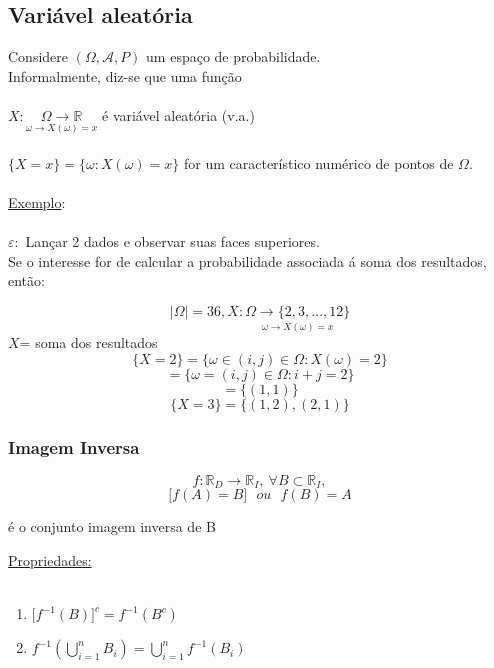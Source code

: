 \documentclass[a4paper,12pt]{article}
\begin{document}
\subsection{Variável aleatória}
Considere $(\Omega,\mathscr{A},P)$ um espaço de probabilidade.\\
Informalmente, diz-se que uma função\\
\\
$X: \underset{\omega \longrightarrow X(\omega)=x}{\Omega \longrightarrow \mathbb{R}}$ é variável aleatória (v.a.)\\
\\
$\{X=x\}=\{\omega: X(\omega)=x \} $ for um característico numérico de pontos de $\Omega$.\\
\\
\underline{Exemplo}:\\
\\
$\varepsilon:$ Lançar 2 dados e observar suas faces superiores.\\
Se o interesse for de calcular a probabilidade associada á soma dos resultados, então:

$$|\Omega|=36,X: \underset{\omega \longrightarrow X(\omega)=x}{\Omega \longrightarrow \{2,3,\ldots,12\}} $$
$X$= soma dos resultados
$$\{X=2\}=\{\omega \in (i,j)\in \Omega: X(\omega)=2 \} $$
$$=\{\omega=(i,j)\in \Omega:i+j=2 \} $$
$$=\{(1,1)\} $$
$$\{X=3\}=\{(1,2),(2,1)\} $$

\subsubsection{Imagem Inversa}

$$f: \mathbb{R}_D\longrightarrow \mathbb{R}_I, \ \forall B \subset \mathbb{R}_I, $$
$$\bigg[f(A)=B \bigg]  \ \ \ ou \ \ \ f(B)=A$$
\begin{center}é o conjunto imagem inversa de B \end{center}

\underline{Propriedades:}\\
\\
\begin{enumerate}[label=\alph*)]
	\item $\bigg[f^{-1}(B) \bigg]^c = f^{-1}(B^c)$
	
	\item $f^{-1}(\bigcup\limits_{i=1}^{n}B_i) = \bigcup\limits_{i=1}^{n}f^{-1}(B_i)$
\end{enumerate}
\end{document}
